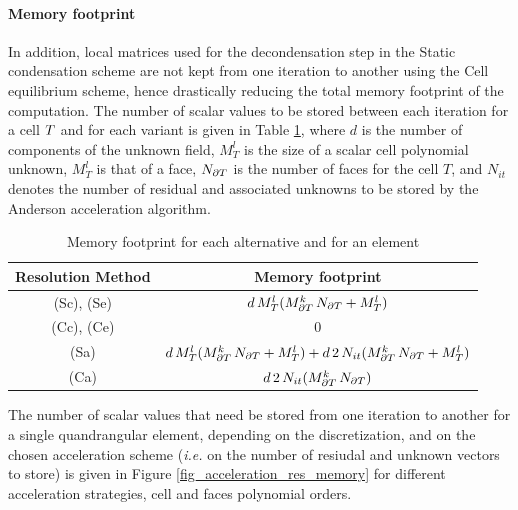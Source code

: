 \paragraph{Memory footprint}

In addition, local matrices used for the decondensation step in the Static condensation scheme are not kept from one iteration
to another using the Cell equilibrium scheme, hence drastically reducing the total memory footprint of the computation.
The number of scalar values to be stored between each iteration for a cell $T$ and for each variant is given in Table \ref{table_memory_footprint}, where $d$ is the number of components of the unknown field,
$M^l_T$ is the size of a scalar cell polynomial unknown, $M^l_T$ is that of a face, $N_{\partial T}$ is the number of faces for the cell $T$, and
$N_{it}$ denotes the number of residual and associated unknowns to be stored by the Anderson acceleration algorithm.

\begin{table}[H]
    \centering
    \begin{tabular}{||c c||} 
        \hline
        Resolution Method & Memory footprint
        \\
        [0.5ex] 
        \hline\hline
        (Sc), (Se) & $d \, M^l_T (M^k_{\partial T} \, N_{\partial T} + M^l_T)$
        \\ \hline
        (Cc), (Ce) & 0
        \\ \hline
        (Sa) & $d \, M^l_T (M^k_{\partial T} \, N_{\partial T} + M^l_T) + d \, 2 \, N_{it} (M^k_{\partial T} \, N_{\partial T} + M^l_T) $
        \\ \hline
        (Ca) & $d \, 2 \, N_{it} (M^k_{\partial T} \, N_{\partial T})$
        \\ \hline
    \end{tabular}
    \caption{Memory footprint for each alternative and for an element}
    \label{table_memory_footprint}
\end{table}

The number of scalar values that need be stored from one iteration to another for a single quandrangular element, depending on the discretization, and on the chosen acceleration scheme (\textit{i.e.} on the number of resiudal and unknown vectors to store)
is given in Figure \ref{fig_acceleration_res_memory} for different acceleration strategies, cell and faces polynomial orders.

